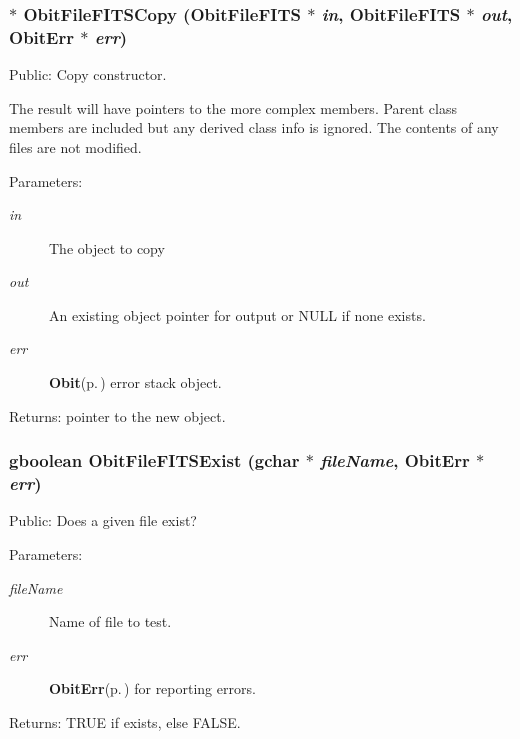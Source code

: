 \subsubsection{$\ast$ Obit\-File\-FITSCopy ({\bf Obit\-File\-FITS} $\ast$ {\em in}, {\bf Obit\-File\-FITS} $\ast$ {\em out}, {\bf Obit\-Err} $\ast$ {\em err})}\label{ObitFileFITS_8c_a9}


Public: Copy constructor. 

The result will have pointers to the more complex members. Parent class members are included but any derived class info is ignored. The contents of any files are not modified. \begin{Desc}
\item[Parameters:]
\begin{description}
\item[{\em in}]The object to copy \item[{\em out}]An existing object pointer for output or NULL if none exists. \item[{\em err}]{\bf Obit}{\rm (p.\,\pageref{structObit})} error stack object. \end{description}
\end{Desc}
\begin{Desc}
\item[Returns:]pointer to the new object. \end{Desc}
\subsubsection{\setlength{\rightskip}{0pt plus 5cm}gboolean Obit\-File\-FITSExist (gchar $\ast$ {\em file\-Name}, {\bf Obit\-Err} $\ast$ {\em err})}\label{ObitFileFITS_8c_a10}


Public: Does a given file exist? 

\begin{Desc}
\item[Parameters:]
\begin{description}
\item[{\em file\-Name}]Name of file to test. \item[{\em err}]{\bf Obit\-Err}{\rm (p.\,\pageref{structObitErr})} for reporting errors. \end{description}
\end{Desc}
\begin{Desc}
\item[Returns:]TRUE if exists, else FALSE. \end{Desc}
